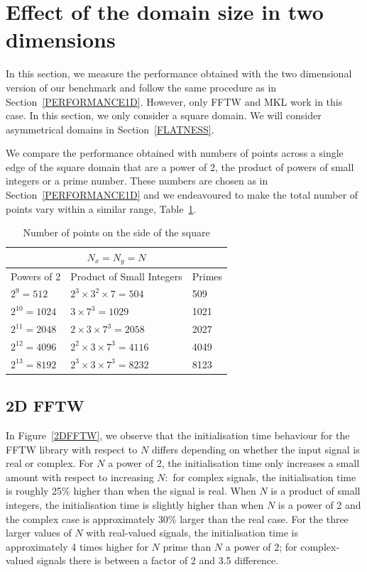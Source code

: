 \documentclass[12pt, a4paper]{article} \setlength{\textheight}{24cm}
\begin{document}
\section{Effect of the domain size in two dimensions}\label{PERFORMANCE2D}

In this section, we measure the performance obtained with the two
dimensional version of our benchmark and follow the same procedure as
in Section~\ref{PERFORMANCE1D}.  However, only FFTW and MKL work in
this case. In this section, we only consider a square domain. We will
consider asymmetrical domains in Section~\ref{FLATNESS}.

We compare the performance obtained with numbers of points across a
single edge of the square domain that are a power of 2, the product of
powers of small integers or a prime number.  These numbers are chosen
as in Section~\ref{PERFORMANCE1D} and we endeavoured to make the total
number of points vary within a similar range, Table~\ref{SIZES2D}.

\begin{table}[H]
  \centering
  \begin{tabular}{|l|l|l|}
    \hline
    \multicolumn{3}{|c|}{$N_x=N_y=N$}\\
    \hline
    \hline
    Powers of 2 & Product of Small Integers & Primes\\ \hline
    $2^9=512$ & $2^3\times 3^2\times 7=504$ & 509\\ \hline
    $2^{10}=1024$ & $3\times 7^3=1029$ & 1021\\ \hline
    $2^{11}=2048$ & $2\times 3\times 7^3=2058$ & 2027\\ \hline
    $2^{12}=4096$ & $2^2\times 3\times 7^3=4116$ & 4049\\ \hline
    $2^{13}=8192$ & $2^3\times 3\times 7^3=8232$ & 8123\\ \hline
  \end{tabular}
  \caption{Number of points on the side of the square}\label{SIZES2D}
\end{table}

\subsection{2D FFTW}
In Figure~\ref{2DFFTW}, we observe that the initialisation time
behaviour for the FFTW library with respect to $N$ differs depending
on whether the input signal is real or complex. For $N$ a power of 2,
the initialisation time only increases a small amount with respect to
increasing $N:$ for complex signals, the initialisation time is
roughly 25\% higher than when the signal is real. When $N$ is a
product of small integers, the initialisation time is slightly higher
than when $N$ is a power of 2 and the complex case is approximately
30\% larger than the real case.  For the three larger values of $N$
with real-valued signals, the initialisation time is approximately 4
times higher for $N$ prime than $N$ a power of 2; for
complex-valued signals there is between a factor of 2 and 3.5
difference.
\end{document}
